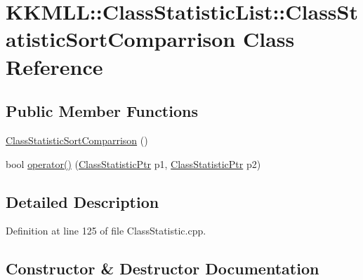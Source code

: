\hypertarget{class_class_statistic_list_1_1_class_statistic_sort_comparrison}{}\section{K\+K\+M\+LL\+:\+:Class\+Statistic\+List\+:\+:Class\+Statistic\+Sort\+Comparrison Class Reference}
\label{class_class_statistic_list_1_1_class_statistic_sort_comparrison}
\subsection*{Public Member Functions}
\begin{DoxyCompactItemize}
\item 
\hyperlink{class_class_statistic_list_1_1_class_statistic_sort_comparrison_a34b54719db660de5bfaacf967f4e57de}{Class\+Statistic\+Sort\+Comparrison} ()
\item 
bool \hyperlink{class_class_statistic_list_1_1_class_statistic_sort_comparrison_ae4858d93ffe8ef51301e9816722a4da8}{operator()} (\hyperlink{namespace_k_k_m_l_l_a85182174e5ae7ba508dad118983b37bc}{Class\+Statistic\+Ptr} p1, \hyperlink{namespace_k_k_m_l_l_a85182174e5ae7ba508dad118983b37bc}{Class\+Statistic\+Ptr} p2)
\end{DoxyCompactItemize}


\subsection{Detailed Description}


Definition at line 125 of file Class\+Statistic.\+cpp.



\subsection{Constructor \& Destructor Documentation}
